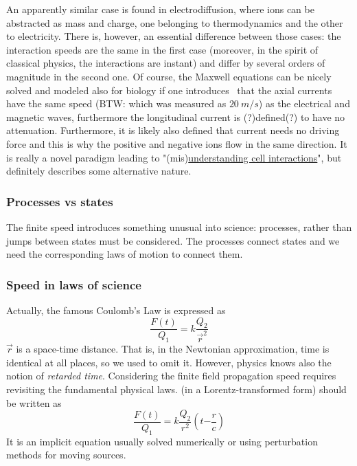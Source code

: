 An apparently
similar case is found in electrodiffusion, where ions can be abstracted
as mass and charge, one belonging to thermodynamics and the other
to electricity. There is, however, an essential difference between
those cases: the interaction speeds are the same in the first case
(moreover, in the spirit of classical physics,
the interactions are instant) and differ by several orders of magnitude
in the second one. 
 Of course, the Maxwell equations can be nicely solved 
and modeled also for biology
if one introduces~\cite{ElectromagneticNeuron:2018}  
that the axial currents have the same speed (BTW: which was measured as $20\ m/s$) as the electrical and magnetic waves,
furthermore the longitudinal current is (?)defined(?) to have no attenuation. 
Furthermore, it is likely also defined that current needs no driving force 
and this is why the positive and negative ions flow in the same direction.  It is really
a novel paradigm leading to "(mis)\href{https://www.nature.com/articles/s41598-018-31054-9}{understanding cell interactions}", but definitely describes some alternative nature.


\subsubsection{Processes vs states
\label{Physics-Processes}
}
The finite speed introduces something unusual into science:
processes, rather than jumps between states must be considered.
The processes connect states and we need the corresponding
laws of motion to connect them. 


\subsubsection[In sciences's laws]{Speed in laws of science\label{PHYSICS_SPEEDS_LAWS}}

Actually,  the famous Coulomb's Law is expressed as
\begin{equation}
\frac{F(t)}{Q_{1}}=k\frac{Q_{2}}{{\overrightarrow{r}}^{2}}\label{eq:CoulombTimeDependentSpaceTime}
\end{equation}
\noindent $\overrightarrow{r}$ is a space-time distance.
That is, in the Newtonian approximation, time is identical at all places,
so we used to omit it. 
However, physics knows also the notion of \textit{retarded time}.
Considering the finite field propagation speed requires revisiting
the fundamental physical laws. (in a Lorentz-transformed form) should be written as
%
\begin{equation}
\frac{F(t)}{Q_{1}}=k\frac{Q_{2}}{r^{2}}(t{-\frac{r}{c}})\label{eq:CoulombTimeDependent}
\end{equation}
%
\noindent
It is an implicit equation usually solved numerically or using perturbation methods for moving sources.
 
